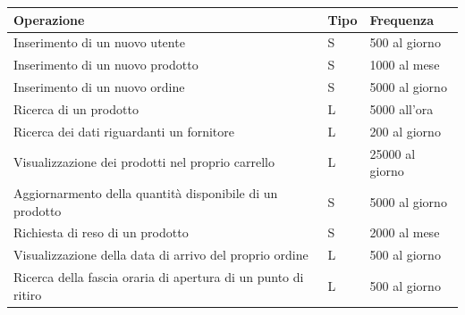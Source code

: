 \documentclass[11pt]{article}
\begin{document}
\begin{center}
    
    \begin{tabularx}{0.98\textwidth} {
        | >{\raggedright\arraybackslash}X |
          >{\raggedright\arraybackslash}X |
          >{\raggedright\arraybackslash}X |
    }

    \hline
    \textbf{Operazione} & \textbf{Tipo} & \textbf{Frequenza} \\
    \hline\hline

    Inserimento di un nuovo utente &
    S &
    500 al giorno \\
    \hline

    Inserimento di un nuovo prodotto &
    S &
    1000 al mese \\
    \hline

    Inserimento di un nuovo ordine &
    S &
    5000 al giorno \\
    \hline

    Ricerca di un prodotto &
    L &
    5000 all'ora \\
    \hline

    Ricerca dei dati riguardanti un fornitore &
    L &
    200 al giorno \\
    \hline

    Visualizzazione dei prodotti nel proprio carrello &
    L &
    25000 al giorno \\
    \hline

    Aggiornarmento della quantità disponibile di un prodotto &
    S &
    5000 al giorno \\
    \hline

    Richiesta di reso di un prodotto  &
    S &
    2000 al mese \\
    \hline

    Visualizzazione della data di arrivo del proprio ordine &
    L &
    500 al giorno \\
    \hline

    Ricerca della fascia oraria di apertura di un punto di ritiro &
    L &
    500 al giorno \\
    \hline
    
    \end{tabularx}
\end{center}
\end{document}
